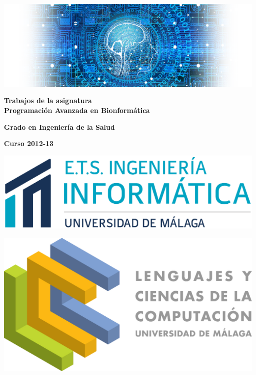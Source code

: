 \documentclass{book}
\begin{document}
	\renewcommand{\tablename}{Tabla}
	
	\BgThispage
	\thispagestyle{empty}
	
	\begin{center}
		\includegraphics[width=\textwidth]{img/logo1.png}
		\vspace{2cm}
		
		{\Large\textbf{Trabajos de la asignatura}\\}
		{\Huge\textbf{Programación Avanzada en Bionformática}}
		\vspace{1cm}
		
		{\Large\textbf{Grado en Ingeniería de la Salud}}
		
		\vspace{1.5cm}
		
		{\Large\textbf{Curso 2012-13}}
		
		\vfill
		
		\begin{minipage}{0.4\textwidth}
			\begin{center}
				\includegraphics[width=\textwidth]{img/etsii}
			\end{center}
		\end{minipage}
		\begin{minipage}{0.4\textwidth}
			\begin{center}
				\includegraphics[width=.6\textwidth]{img/lcc}
			\end{center}
		\end{minipage}
	\end{center}
	
\end{document}
